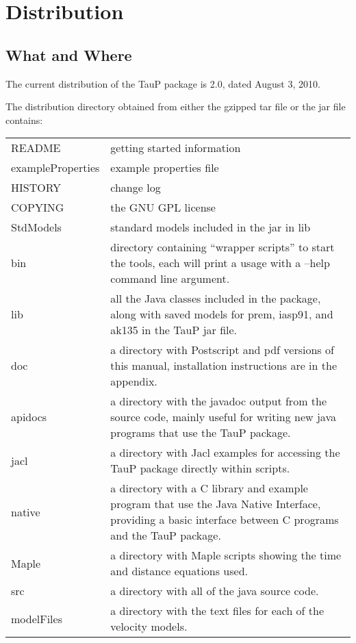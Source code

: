 
\section{Distribution}


\subsection{What and Where}
The current distribution of the TauP package is 2.0, dated August 3, 2010.

The distribution directory obtained from either the gzipped tar file or the jar file contains:

\begin{center}
\begin{tabular}{lp{4in}}
README & getting started information \\
exampleProperties & example properties file \\
HISTORY & change log \\
COPYING & the GNU GPL license \\
StdModels & standard models included in the jar in lib \\
bin & directory containing ``wrapper scripts'' to start the tools,
   each will print a usage with a --help command line argument. \\
lib & all the Java classes included in the package, along with
               saved models for prem, iasp91, and ak135 in the TauP jar file. \\
doc & a directory with Postscript and pdf versions of this manual,
installation instructions are in the appendix. \\
apidocs & a directory with the javadoc output from
the source code, mainly useful
for writing new java programs that use the TauP package. \\
jacl & a directory with Jacl examples for accessing the TauP package directly within scripts. \\
native & a directory with a C library and example program that use the
Java Native Interface, providing a basic interface between C programs
and the TauP package. \\
Maple & a directory with Maple scripts showing the time and distance equations
used. \\
src & a directory with all of the java source code. \\
modelFiles & a directory with the text files for each of the velocity models.
\end{tabular}
\end{center}

